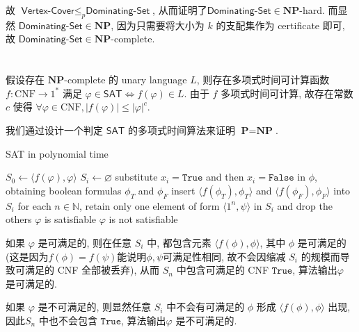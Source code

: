 \documentclass[8pt]{article}
\theoremstyle{compact}
\def\le{\leqslant}
\begin{document}
故 $\textsf{Vertex-Cover} \le_p \textsf{Dominating-Set}$, 从而证明了$\textsf{Dominating-Set} \in \mathbf{NP}$-hard. 而显然 $\textsf{Dominating-Set} \in \mathbf{NP}$, 因为只需要将大小为 $k$ 的支配集作为 certificate  即可, 故 $\textsf{Dominating-Set} \in \mathbf{NP}$-complete.


\section{}
假设存在 $\mathbf{NP}$-complete 的 unary language $L$, 则存在多项式时间可计算函数 $f: \text{CNF} \to 1^*$ 满足 $\varphi \in \textsf{SAT} \Leftrightarrow f(\varphi) \in L$. 由于 $f$ 多项式时间可计算, 故存在常数 $c$ 使得 $\forall \varphi \in \text{CNF}, |f(\varphi)| \le |\varphi|^c$.

我们通过设计一个判定 $\textsf{SAT}$ 的多项式时间算法来证明 $\textbf{P} = \textbf{NP}$.

\begin{algorithm}
	\caption{\textsf{SAT} in polynomial time}
	\begin{algorithmic}[1]
		\State $S_0 \gets \langle f(\varphi), \varphi \rangle$
			\State $S_i \gets \varnothing$
				\State substitute $x_i = \texttt{True}$ and then $x_i = \texttt{False}$ in $\phi$, obtaining boolean formulas $\phi_{T}$ and $\phi_{F}$
				\State insert $\langle f(\phi_T), \phi_T \rangle$ and $\langle f(\phi_F), \phi_F \rangle$ into $S_i$
			\EndFor
			\State for each $n \in \mathbb N$, retain only one element of form $\langle 1^n, \psi \rangle$ in $S_i$ and drop the others
		\EndFor
			\State \Return $\varphi$ is satisfiable
		\Else
			\State \Return $\varphi$ is not satisfiable
		\EndIf
	\end{algorithmic}
\end{algorithm}

如果 $\varphi$ 是可满足的, 则在任意 $S_i$ 中, 都包含元素 $\langle f(\phi), \phi \rangle$, 其中 $\phi$ 是可满足的(这是因为$f(\phi) = f(\psi)$能说明$\phi, \psi$可满足性相同, 故不会因缩减 $S_i$ 的规模而导致可满足的 CNF 全部被丢弃), 从而 $S_n$ 中包含可满足的 CNF $\texttt{True}$, 算法输出$\varphi$ 是可满足的. 

如果 $\varphi$ 是不可满足的, 则显然任意 $S_i$ 中不会有可满足的 $\phi$ 形成 $\langle f(\phi), \phi \rangle$ 出现, 因此$S_n$ 中也不会包含 $\texttt{True}$, 算法输出$\varphi$ 是不可满足的. 
\end{document}
